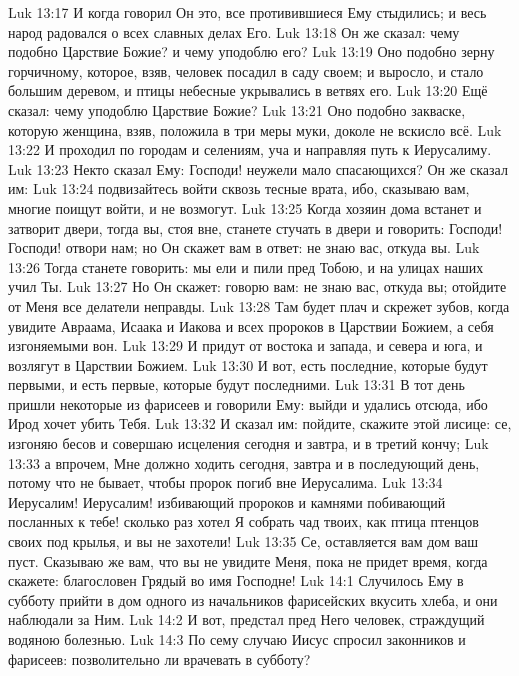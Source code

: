 \vs Luk 13:17 И когда говорил Он это, все противившиеся Ему стыдились; и весь народ радовался о всех славных делах Его.
\rsbpar\vs Luk 13:18 Он же сказал: чему подобно Царствие Божие? и чему уподоблю его?
\vs Luk 13:19 Оно подобно зерну горчичному, которое, взяв, человек посадил в саду своем; и выросло, и стало большим деревом, и птицы небесные укрывались в ветвях его.
\vs Luk 13:20 Ещё сказал: чему уподоблю Царствие Божие?
\vs Luk 13:21 Оно подобно закваске, которую женщина, взяв, положила в три меры муки, доколе не вскисло всё.
\rsbpar\vs Luk 13:22 И проходил по городам и селениям, уча и направляя путь к Иерусалиму.
\rsbpar\vs Luk 13:23 Некто сказал Ему: Господи! неужели мало спасающихся? Он же сказал им:
\vs Luk 13:24 подвизайтесь войти сквозь тесные врата, ибо, сказываю вам, многие поищут войти, и не возмогут.
\vs Luk 13:25 Когда хозяин дома встанет и затворит двери, тогда вы, стоя вне, станете стучать в двери и говорить: Господи! Господи! отвори нам; но Он скажет вам в ответ: не знаю вас, откуда вы.
\vs Luk 13:26 Тогда станете говорить: мы ели и пили пред Тобою, и на улицах наших учил Ты.
\vs Luk 13:27 Но Он скажет: говорю вам: не знаю вас, откуда вы; отойдите от Меня все делатели неправды.
\vs Luk 13:28 Там будет плач и скрежет зубов, когда увидите Авраама, Исаака и Иакова и всех пророков в Царствии Божием, а себя изгоняемыми вон.
\vs Luk 13:29 И придут от востока и запада, и севера и юга, и возлягут в Царствии Божием.
\vs Luk 13:30 И вот, есть последние, которые будут первыми, и есть первые, которые будут последними.
\rsbpar\vs Luk 13:31 В тот день пришли некоторые из фарисеев и говорили Ему: выйди и удались отсюда, ибо Ирод хочет убить Тебя.
\vs Luk 13:32 И сказал им: пойдите, скажите этой лисице: се, изгоняю бесов и совершаю исцеления сегодня и завтра, и в третий  кончу;
\vs Luk 13:33 а впрочем, Мне должно ходить сегодня, завтра и в последующий день, потому что не бывает, чтобы пророк погиб вне Иерусалима.
\vs Luk 13:34 Иерусалим! Иерусалим! избивающий пророков и камнями побивающий посланных к тебе! сколько раз хотел Я собрать чад твоих, как птица птенцов своих под крылья, и вы не захотели!
\vs Luk 13:35 Се, оставляется вам дом ваш пуст. Сказываю же вам, что вы не увидите Меня, пока не придет время, когда скажете: благословен Грядый во имя Господне!
\vs Luk 14:1 Случилось Ему в субботу прийти в дом одного из начальников фарисейских вкусить хлеба, и они наблюдали за Ним.
\vs Luk 14:2 И вот, предстал пред Него человек, страждущий водяною болезнью.
\vs Luk 14:3 По сему случаю Иисус спросил законников и фарисеев: позволительно ли врачевать в субботу?
